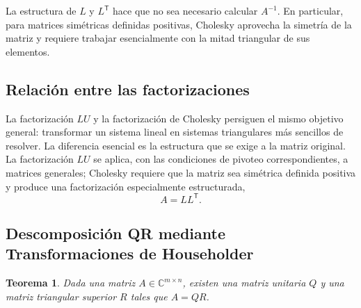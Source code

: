 \documentclass[12pt]{article}
\newtheorem{teorema}{Teorema}
\begin{document}
\begin{observacion}
La estructura de $L$ y $L^{\mathsf T}$ hace que no sea necesario calcular $A^{-1}$. En particular, para matrices simétricas definidas positivas, Cholesky aprovecha la simetría de la matriz y requiere trabajar esencialmente con la mitad triangular de sus elementos.
\end{observacion}

\subsection*{Relación entre las factorizaciones}

La factorización $LU$ y la factorización de Cholesky persiguen el mismo objetivo general: transformar un sistema lineal en sistemas triangulares más sencillos de resolver. La diferencia esencial es la estructura que se exige a la matriz original. La factorización $LU$ se aplica, con las condiciones de pivoteo correspondientes, a matrices generales; Cholesky requiere que la matriz sea simétrica definida positiva y produce una factorización especialmente estructurada,
\[
    A=LL^{\mathsf T}.
\]

\subsection*{Descomposición QR mediante Transformaciones de Householder}

\begin{teorema}
Dada una matriz $A \in \mathbb{C}^{m \times n}$, existen una matriz unitaria $Q$ y una matriz triangular superior $R$ tales que $A = QR$.
\end{teorema}
\end{document}
